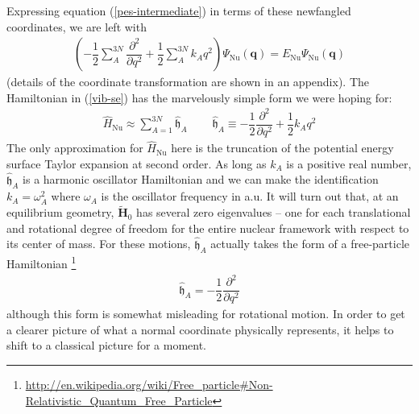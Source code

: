 \documentclass[11pt]{article}
\newcommand{\bo}[1]{\ensuremath{\mathbf{#1}}}
\newcommand{\tl}[1]{\ensuremath{\tilde{#1}}}
\renewcommand{\sp}{\ \ \ \ \ \ \ \ \ \ }
\newcommand{\fr}[2]{\dfrac{#1}{#2}}
\newcommand{\pr}[1]{\left(#1\right)}
\newcommand{\pd}[3]{\ensuremath{ \dfrac{ \partial^{#1} #2 }{\partial #3 ^{#1}}}}
\newcommand{\Nu}{\ensuremath{\mathrm{Nu}}}
\newcommand{\op}[1]{\ensuremath{\hat{#1}}}
\newcommand{\Y}{\ensuremath{\Psi}}
\newcommand{\w}{\ensuremath{\omega}}
\newcommand{\mf}[1]{\ensuremath{\mathfrak{#1}}}
\begin{document}
Expressing equation (\ref{pes-intermediate}) in terms of these newfangled
coordinates, we are left with 
\begin{align}
\label{vib-se}
\pr{
-\fr{1}{2}\sum_A^{3N}
    \pd{2}{}{q}
+\fr{1}{2}\sum_A^{3N}
    k_A q^2
}
    \Y_\Nu(\bo{q})
=
    E_\Nu
    \Y_\Nu(\bo{q})
\end{align}
(details of the coordinate transformation are shown in an appendix). The
Hamiltonian in (\ref{vib-se}) has the marvelously simple form we were hoping
for:
\begin{align}
\label{harm-hamiltonian}
    \op{H}_\Nu
\approx
    \sum_{A=1}^{3N}
    \op{\mf{h}}_A
\sp
    \op{\mf{h}}_A
\equiv
-\fr{1}{2}
    \pd{2}{}{q}
+\fr{1}{2}
    k_A q^2
\end{align}
The only approximation for $\op{H}_\Nu$ here is the truncation of the potential
energy surface Taylor expansion at second order. As long as $k_A$ is a
positive real number, $\op{\mf{h}}_A$ is a harmonic oscillator Hamiltonian and
we can make the identification $k_A=\w_A^2$ where $\w_A$ is the oscillator
frequency in a.u. It will turn out that, at an equilibrium geometry,
$\tl{\bo{H}}_0$ has several zero eigenvalues -- one for each translational and
rotational degree of freedom for the entire nuclear framework with respect to
its center of mass. For these motions, $\op{\mf{h}}_A$ actually takes the form
of a free-particle Hamiltonian
\footnote{\url{http://en.wikipedia.org/wiki/Free_particle\#Non-Relativistic_Quantum_Free_Particle}}
\begin{align}
    \op{\mf{h}}_A
    = -\fr{1}{2} \pd{2}{}{q}
\end{align}
although this form is somewhat misleading for rotational motion. In order to
get a clearer picture of what a normal coordinate physically represents, it
helps to shift to a classical picture for a moment.
\end{document}
